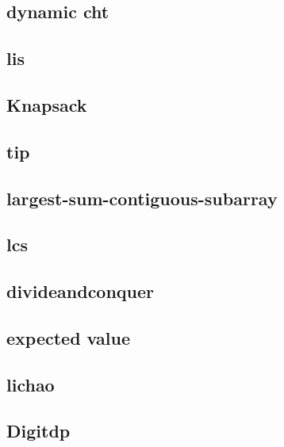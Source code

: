 \subsection{dynamic cht}
\raggedbottom
\hrulefill
\subsection{lis}
\raggedbottom
\hrulefill
\subsection{Knapsack}
\raggedbottom
\hrulefill
\subsection{tip}
\raggedbottom
\hrulefill
\subsection{largest-sum-contiguous-subarray}
\raggedbottom
\hrulefill
\subsection{lcs}
\raggedbottom
\hrulefill
\subsection{divideandconquer}
\raggedbottom
\hrulefill
\subsection{expected value}
\raggedbottom
\hrulefill
\subsection{lichao}
\raggedbottom
\hrulefill
\subsection{Digitdp}
\raggedbottom
\hrulefill

